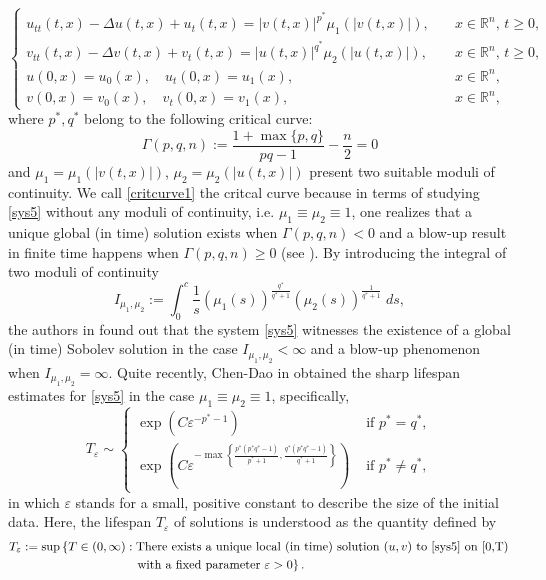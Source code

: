 \documentclass[11pt,reqno]{amsart}
\newcommand{\di}{\displaystyle}
\newcommand{\tron}[1]{\left( #1 \right)}
\numberwithin{equation}{section}
\newcommand{\ity}{\infty}
\theoremstyle{plain}
\begin{document}
\begin{equation}\label{sys5}
\begin{cases}
u_{tt}(t,x)-\Delta u(t,x) +u_t(t,x)=|v(t,x)|^{p^*}\mu_{1}(|v(t,x)|),\quad &x\in \mathbb{R}^n,\, t\geq 0, \\
v_{tt}(t,x)-\Delta v(t,x) +v_t(t,x)=|u(t,x)|^{q^*}\mu_{2}(|u(t,x)|),\quad &x\in \mathbb{R}^n,\, t\geq 0,\\
u(0,x)=u_0(x), \quad u_t(0,x)=u_1(x), \quad &x\in \mathbb{R}^n,\\
v(0,x)=v_0(x), \quad v_t(0,x)=v_1(x), \quad &x\in \mathbb{R}^n,
\end{cases}
\end{equation}
where $p^*,q^*$ belong to the following critical curve:
\begin{equation}\label{critcurve1}
\Gamma(p,q,n):= \frac{1+\max\{p,q\}}{pq-1}-\frac{n}{2}=0
\end{equation}
and $\mu_1=\mu_1(|v(t,x)|)$, $\mu_2=\mu_2(|u(t,x)|)$ present two suitable moduli of continuity. We call \eqref{critcurve1} the critcal curve because in terms of studying \eqref{sys5} without any moduli of continuity, i.e. $\mu_1\equiv \mu_2\equiv 1$, one realizes that a unique global (in time) solution exists when $\Gamma(p,q,n)<0$ and a blow-up result in finite time happens when $\Gamma(p,q,n)\ge 0$ (see \cite{Sun2007,NishiharaWakasugi}). By introducing the integral of two moduli of continuity
\begin{equation*}\label{con2}
I_{\mu_1,\mu_2}:= \di\int_{0}^c\frac{1}{s}\tron{\mu_1(s)}^{\frac{q^*}{q^*+1}}\tron{\mu_2(s)}^{\frac{1}{q^*+1}}\;ds,
\end{equation*}
the authors in \cite{AnhRei2021} found out that the system \eqref{sys5} witnesses the existence of a global (in time) Sobolev solution in the case $I_{\mu_1,\mu_2}<\infty$ and a blow-up phenomenon when $I_{\mu_1,\mu_2}=\infty$. Quite recently, Chen-Dao in \cite{ChenAnh2021} obtained the sharp lifespan estimates for \eqref{sys5} in the case $\mu_1\equiv \mu_2\equiv 1$, specifically, 
\[
T_{\varepsilon}\sim 
\begin{cases}
    \exp\tron{C\varepsilon^{-p^*-1}} &\text{ if }p^*=q^*,\\
    \exp\tron{C\varepsilon^{-\max\left\{\frac{p^*(p^*q^*-1)}{p^*+1},\frac{q^*(p^*q^*-1)}{q^*+1}\right\}}} &\text{ if }p^*\neq q^*,
\end{cases}
\]
in which $\varepsilon$ stands for a small, positive constant to describe the size of the initial data. Here, the lifespan $T_\varepsilon$ of solutions is understood as the quantity defined by
\begin{align*}\label{Lifespan_Defn}
T_\varepsilon:= \sup& \left\{T\in (0,\ity) : \mbox{There exists a unique local (in time) solution } (u,v) \mbox{ to \eqref{sys5} on [0,T)}\right.\notag \\
	&\left. \qquad\qquad\qquad \mbox{with a fixed parameter }\varepsilon>0\right\}.	
\end{align*}
\end{document}
